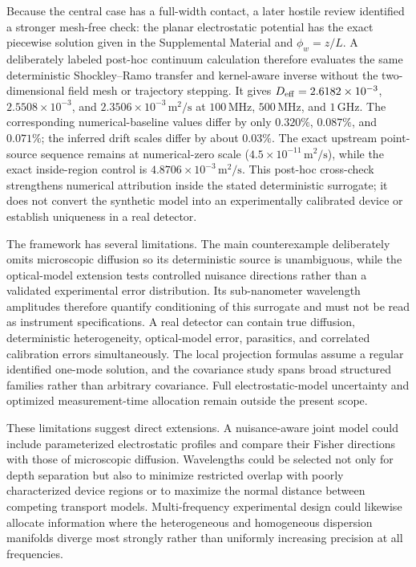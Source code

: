 \documentclass[aps,pra,twocolumn,superscriptaddress,nofootinbib]{revtex4-2}
\begin{document}
Because the central case has a full-width contact, a later hostile review identified a stronger mesh-free check: the planar electrostatic potential has the exact piecewise solution given in the Supplemental Material and $\phi_w=z/L$.  A deliberately labeled post-hoc continuum calculation therefore evaluates the same deterministic Shockley--Ramo transfer and kernel-aware inverse without the two-dimensional field mesh or trajectory stepping.  It gives $D_{\rm eff}=2.6182\times10^{-3}$, $2.5508\times10^{-3}$, and $2.3506\times10^{-3}\,\mathrm{m^2/s}$ at $100\,\mathrm{MHz}$, $500\,\mathrm{MHz}$, and $1\,\mathrm{GHz}$.  The corresponding numerical-baseline values differ by only $0.320\%$, $0.087\%$, and $0.071\%$; the inferred drift scales differ by about $0.03\%$.  The exact upstream point-source sequence remains at numerical-zero scale ($4.5\times10^{-11}\,\mathrm{m^2/s}$), while the exact inside-region control is $4.8706\times10^{-3}\,\mathrm{m^2/s}$.  This post-hoc cross-check strengthens numerical attribution inside the stated deterministic surrogate; it does not convert the synthetic model into an experimentally calibrated device or establish uniqueness in a real detector.

The framework has several limitations. The main counterexample deliberately omits microscopic diffusion so its deterministic source is unambiguous, while the optical-model extension tests controlled nuisance directions rather than a validated experimental error distribution. Its sub-nanometer wavelength amplitudes therefore quantify conditioning of this surrogate and must not be read as instrument specifications. A real detector can contain true diffusion, deterministic heterogeneity, optical-model error, parasitics, and correlated calibration errors simultaneously. The local projection formulas assume a regular identified one-mode solution, and the covariance study spans broad structured families rather than arbitrary covariance. Full electrostatic-model uncertainty and optimized measurement-time allocation remain outside the present scope.

These limitations suggest direct extensions. A nuisance-aware joint model could include parameterized electrostatic profiles and compare their Fisher directions with those of microscopic diffusion. Wavelengths could be selected not only for depth separation but also to minimize restricted overlap with poorly characterized device regions or to maximize the normal distance between competing transport models. Multi-frequency experimental design could likewise allocate information where the heterogeneous and homogeneous dispersion manifolds diverge most strongly rather than uniformly increasing precision at all frequencies.
\end{document}
